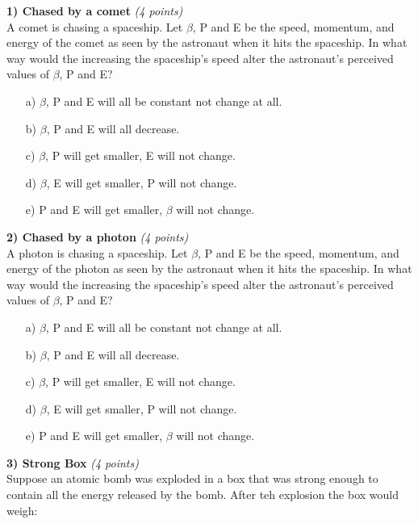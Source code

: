 {\large


\textbf{1) Chased by a comet }\hfill \textit{(4 points)}\\
A comet is chasing a spaceship.
Let $\beta$, P and E be the speed, momentum, and energy of the comet as seen by the astronaut when it hits the spaceship. 
In what way would the increasing the spaceship's speed alter the astronaut's perceived values of $\beta$, P and E?

\begin{itemize}
\item[a)] $\beta$, P and E will all be constant not change at all.
\item[b)] $\beta$, P and E will all decrease.
\item[c)] $\beta$, P will get smaller, E will not change.
\item[d)] $\beta$, E will get smaller, P will not change.
\item[e)] P and E will get smaller, $\beta$ will not change.
\end{itemize}

\vspace{0.5in}

\textbf{2) Chased by a photon }\hfill \textit{(4 points)}\\
A photon is chasing a spaceship.
Let $\beta$, P and E be the speed, momentum, and energy of the photon as seen by the astronaut when it hits the spaceship. 
In what way would the increasing the spaceship's speed alter the astronaut's perceived values of $\beta$, P and E?

\begin{itemize}
\item[a)] $\beta$, P and E will all be constant not change at all.
\item[b)] $\beta$, P and E will all decrease.
\item[c)] $\beta$, P will get smaller, E will not change.
\item[d)] $\beta$, E will get smaller, P will not change.
\item[e)] P and E will get smaller, $\beta$ will not change.
\end{itemize}

\vspace{0.5in}

\textbf{3) Strong Box }\hfill \textit{(4 points)}\\
Suppose an atomic bomb was exploded in a box that was strong enough to contain all the energy released by the bomb.
After teh explosion the box would weigh:

}
